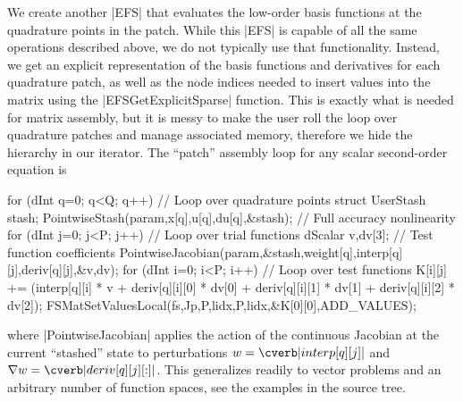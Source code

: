 We create another \cverb|EFS| that evaluates the low-order basis functions at the quadrature points in the patch.
While this \cverb|EFS| is capable of all the same operations described above, we do not typically use that functionality.
Instead, we get an explicit representation of the basis functions and derivatives for each quadrature patch, as well as the node indices needed to insert values into the matrix using the \cverb|EFSGetExplicitSparse| function.
This is exactly what is needed for matrix assembly, but it is messy to make the user roll the loop over quadrature patches and manage associated memory, therefore we hide the hierarchy in our iterator.
The ``patch'' assembly loop for any scalar second-order equation is
\begin{ccode}
  for (dInt q=0; q<Q; q++) {                      // Loop over quadrature points
    struct UserStash stash;
    PointwiseStash(param,x[q],u[q],du[q],&stash); // Full accuracy nonlinearity
    for (dInt j=0; j<P; j++) {                    // Loop over trial functions
      dScalar v,dv[3];                            // Test function coefficients
      PointwiseJacobian(param,&stash,weight[q],interp[q][j],deriv[q][j],&v,dv);
      for (dInt i=0; i<P; i++) {                  // Loop over test functions
        K[i][j] += (interp[q][i] * v
                    + deriv[q][i][0] * dv[0]
                    + deriv[q][i][1] * dv[1]
                    + deriv[q][i][2] * dv[2]);
      }
    }
  }
  FSMatSetValuesLocal(fs,Jp,P,lidx,P,lidx,&K[0][0],ADD_VALUES);
\end{ccode}
where \cverb|PointwiseJacobian| applies the action of the continuous Jacobian at the current ``stashed'' state to perturbations $w = \cverb|interp[q][j]|$ and $\nabla w = \cverb|deriv[q][j][:]|$.
This generalizes readily to vector problems and an arbitrary number of function spaces, see the examples in the {\Dohp} source tree.

